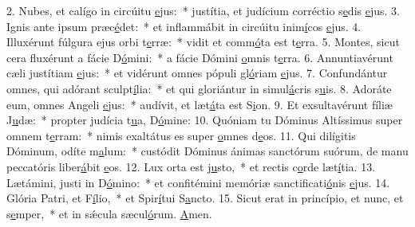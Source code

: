 2. Nubes, et calígo in circúitu \uline{e}jus:~* justítia, et judícium corréctio s\uline{e}dis \uline{e}jus.
3. Ignis ante ipsum præc\uline{é}det:~* et inflammábit in circúitu inim\uline{í}cos \uline{e}jus.
4. Illuxérunt fúlgura ejus orbi t\uline{e}rræ:~* vidit et comm\uline{ó}ta est t\uline{e}rra.
5. Montes, sicut cera fluxérunt a fácie D\uline{ó}mini:~* a fácie Dómini \uline{o}mnis t\uline{e}rra.
6. Annuntiavérunt cæli justítiam \uline{e}jus:~* et vidérunt omnes pópuli gl\uline{ó}riam \uline{e}jus.
7. Confundántur omnes, qui adórant sculpt\uline{í}lia:~* et qui gloriántur in simul\uline{á}cris s\uline{u}is.
8. Adoráte eum, omnes Angeli \uline{e}jus:~* audívit, et læt\uline{á}ta est S\uline{i}on.
9. Et exsultavérunt fíliæ J\uline{u}dæ:~* propter judícia t\uline{u}a, D\uline{ó}mine:
10. Quóniam tu Dóminus Altíssimus super omnem t\uline{e}rram:~* nimis exaltátus es super \uline{o}mnes d\uline{e}os.
11. Qui dilígitis Dóminum, odíte m\uline{a}lum:~* custódit Dóminus ánimas sanctórum suórum, de manu peccatóris liber\uline{á}bit \uline{e}os.
12. Lux orta est j\uline{u}sto,~* et rectis c\uline{o}rde læt\uline{í}tia.
13. Lætámini, justi in D\uline{ó}mino:~* et confitémini memóriæ sanctificati\uline{ó}nis \uline{e}jus.
14. Glória Patri, et F\uline{í}lio,~* et Spir\uline{í}tui S\uline{a}ncto.
15. Sicut erat in princípio, et nunc, et s\uline{e}mper,~* et in sǽcula sæcul\uline{ó}rum. \uline{A}men.
